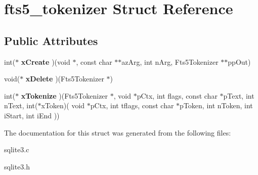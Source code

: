 \hypertarget{structfts5__tokenizer}{}\section{fts5\+\_\+tokenizer Struct Reference}
\label{structfts5__tokenizer}
\subsection*{Public Attributes}
\begin{DoxyCompactItemize}
\item 
int($\ast$ {\bfseries x\+Create} )(void $\ast$, const char $\ast$$\ast$az\+Arg, int n\+Arg, Fts5\+Tokenizer $\ast$$\ast$pp\+Out)\hypertarget{structfts5__tokenizer_ab0e73328047d3191668ecad51839873d}{}\label{structfts5__tokenizer_ab0e73328047d3191668ecad51839873d}

\item 
void($\ast$ {\bfseries x\+Delete} )(Fts5\+Tokenizer $\ast$)\hypertarget{structfts5__tokenizer_a5df6926b15f5ccbffdcdf635f2f76142}{}\label{structfts5__tokenizer_a5df6926b15f5ccbffdcdf635f2f76142}

\item 
int($\ast$ {\bfseries x\+Tokenize} )(Fts5\+Tokenizer $\ast$, void $\ast$p\+Ctx, int flags, const char $\ast$p\+Text, int n\+Text, int($\ast$x\+Token)(                       void $\ast$p\+Ctx,                           
                       int tflags,                           
                       const char $\ast$p\+Token,                       int n\+Token,                           
                       int i\+Start,                           
                       int i\+End                                       
               ))\hypertarget{structfts5__tokenizer_a7e4fce365700c8e3801c5dc6f7f2d064}{}\label{structfts5__tokenizer_a7e4fce365700c8e3801c5dc6f7f2d064}

\end{DoxyCompactItemize}


The documentation for this struct was generated from the following files\+:\begin{DoxyCompactItemize}
\item 
sqlite3.\+c\item 
sqlite3.\+h\end{DoxyCompactItemize}

